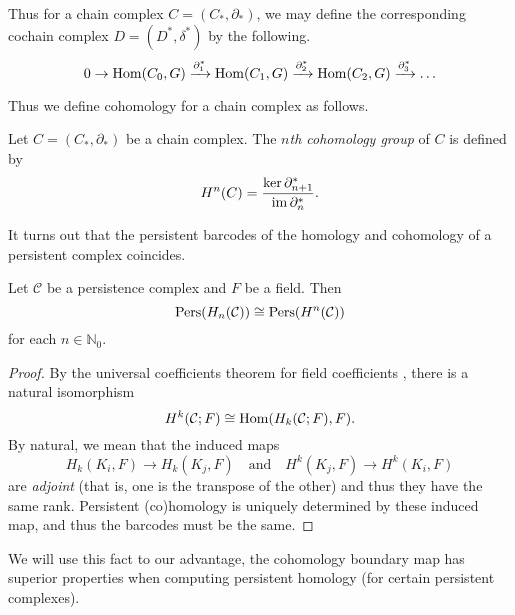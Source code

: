Thus for a chain complex $C = (C_*, \partial_*)$, we may define the corresponding cochain complex $D = (D^*, \delta^*)$ by the following.
\[ 0 \to \operatorname{Hom}(C_0, G) \xrightarrow{\partial^*_{1}} \operatorname{Hom}(C_1, G) \xrightarrow{\partial^*_{2}} \operatorname{Hom}(C_2, G) \xrightarrow{\partial^*_{3}} \ldots \]

Thus we define cohomology for a chain complex as follows.

\begin{definition}
    Let $C = (C_*, \partial_*)$ be a chain complex. The \emph{$n$th cohomology group} of $C$ is defined by
    \[ H^n(C) = \frac{\ker\partial^*_{n+1}}{\operatorname{im}\partial^*_n}. \]
\end{definition}

It turns out that the persistent barcodes of the homology and cohomology of a persistent complex coincides.

\begin{lemma}
    \label{lem:hom-cohom-barcodes-equiv}
    Let $\mathcal C$ be a persistence complex and $F$ be a field. Then
    \[ \operatorname{Pers}(H_n(\mathcal C)) \cong \operatorname{Pers}(H^n(\mathcal C)) \]
    for each $n \in \mathbb N_0$.
\end{lemma}

\begin{proof}
    By the universal coefficients theorem for field coefficients \cite{rosenberg1987kunneth}, there is a natural isomorphism
    \[ H^k(\mathcal C; F) \cong \operatorname{Hom}(H_k(\mathcal C; F), F). \]
    By natural, we mean that the induced maps
    \[ H_k(K_i, F) \to H_k(K_j, F) \quad\text{and}\quad
        H^k(K_j, F) \to H^k(K_i, F) \]
    are \emph{adjoint} (that is, one is the transpose of the other) and thus they have the same rank. Persistent (co)homology is uniquely determined by these induced map, and thus the barcodes must be the same.
\end{proof}

We will use this fact to our advantage, the cohomology boundary map has superior properties when computing persistent homology (for certain persistent complexes).
